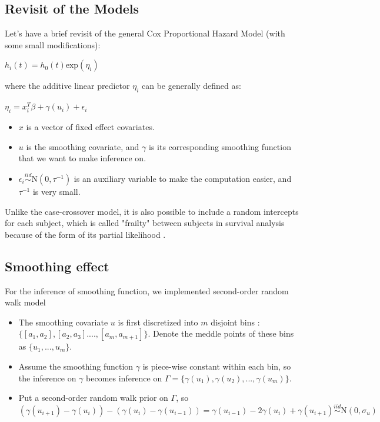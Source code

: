 \documentclass{beamer} %
\begin{document}
\subsection{Revisit of the Models}
\begin{frame}
Let's have a brief revisit of the general Cox Proportional Hazard Model (with some small modifications):
\begin{center}
$h_{i}(t) = h_{0}(t) \text{exp}(\eta_i)$
\end{center}
where the additive linear predictor $\eta_i$ can be generally defined as:
\begin{center}
$\eta_i = x_{i} ^ {T}  \beta + \gamma(u_i) + \epsilon_i$ 
\end{center}
\begin{itemize}
\pause
\item $x$ is a vector of fixed effect covariates.
\pause
\item $u$ is the smoothing covariate, and $\gamma$ is its corresponding smoothing function that we want to make inference on.
\pause
\item $\epsilon_i  \stackrel{iid}{\sim} \text{N}(0,\tau^{-1})$ is an auxiliary variable to make the computation easier, and $\tau^{-1}$ is very small.
\end{itemize}
\pause
Unlike the case-crossover model, it is also possible to include a random intercepts for each subject, which is called "frailty" between subjects in survival analysis because of the form of its partial likelihood \citep{frailty}.
\end{frame}

\subsection{Smoothing effect}
\begin{frame}
For the inference of smoothing function, we implemented second-order random walk model \citep{rw2}\newline
\begin{itemize}
\pause
\item The smoothing covariate $u$ is first discretized into $m$ disjoint bins : $\{[a_{1}, a_{2}], [a_{2}, a_{3}]...., [a_{m}, a_{m+1}] \}$. Denote the meddle points of these bins as $\{u_{1}, ..., u_{m} \}$.
\pause
\item Assume the smoothing function $\gamma$ is piece-wise constant within each bin, so the inference on $\gamma$ becomes inference on $\Gamma = \{\gamma(u_{1}),\gamma(u_{2}), ...,  \gamma(u_{m})\}$.
\pause
\item Put a second-order random walk prior on $\Gamma$, so $(\gamma(u_{i+1})-\gamma(u_{i})) - (\gamma(u_{i})-\gamma(u_{i-1})) = \gamma(u_{i-1})-2\gamma(u_{i}) + \gamma(u_{i+1}) \stackrel{iid}{\sim} \text{N}(0,\sigma_{u})$
\end{itemize}
\end{frame}
\end{document}
